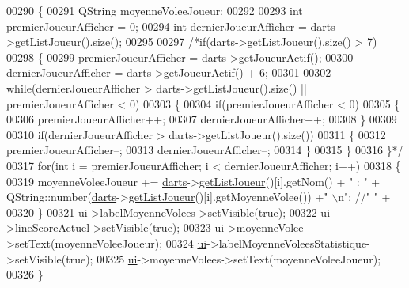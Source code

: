 \begin{DoxyCode}
00290 \{
00291     QString moyenneVoleeJoueur;
00292 
00293     \textcolor{keywordtype}{int} premierJoueurAfficher = 0;
00294     \textcolor{keywordtype}{int} dernierJoueurAfficher = \hyperlink{class_ihm_a2a0f54d33f4d6b2531ec2190c4a2356e}{darts}->\hyperlink{class_darts_a0525b09703d3461bf5570197354743c3}{getListJoueur}().size();
00295 
00297     \textcolor{comment}{/*if(darts->getListJoueur().size() > 7)}
00298 \textcolor{comment}{    \{}
00299 \textcolor{comment}{        premierJoueurAfficher = darts->getJoueurActif();}
00300 \textcolor{comment}{        dernierJoueurAfficher = darts->getJoueurActif() + 6;}
00301 \textcolor{comment}{}
00302 \textcolor{comment}{        while(dernierJoueurAfficher > darts->getListJoueur().size() || premierJoueurAfficher < 0)}
00303 \textcolor{comment}{        \{}
00304 \textcolor{comment}{            if(premierJoueurAfficher < 0)}
00305 \textcolor{comment}{            \{}
00306 \textcolor{comment}{                premierJoueurAfficher++;}
00307 \textcolor{comment}{                dernierJoueurAfficher++;}
00308 \textcolor{comment}{            \}}
00309 \textcolor{comment}{}
00310 \textcolor{comment}{            if(dernierJoueurAfficher > darts->getListJoueur().size())}
00311 \textcolor{comment}{            \{}
00312 \textcolor{comment}{                premierJoueurAfficher--;}
00313 \textcolor{comment}{                dernierJoueurAfficher--;}
00314 \textcolor{comment}{            \}}
00315 \textcolor{comment}{        \}}
00316 \textcolor{comment}{    \}*/}
00317     \textcolor{keywordflow}{for}(\textcolor{keywordtype}{int} i = premierJoueurAfficher; i < dernierJoueurAfficher; i++)
00318     \{
00319         moyenneVoleeJoueur += \hyperlink{class_ihm_a2a0f54d33f4d6b2531ec2190c4a2356e}{darts}->\hyperlink{class_darts_a0525b09703d3461bf5570197354743c3}{getListJoueur}()[i].getNom() + \textcolor{stringliteral}{" : "} + 
      QString::number(\hyperlink{class_ihm_a2a0f54d33f4d6b2531ec2190c4a2356e}{darts}->\hyperlink{class_darts_a0525b09703d3461bf5570197354743c3}{getListJoueur}()[i].getMoyenneVolee()) +\textcolor{stringliteral}{" \(\backslash\)n"}; \textcolor{comment}{//"         " +}
00320     \}
00321     \hyperlink{class_ihm_a0ac5f47856566ceeeca1720109bf70ea}{ui}->labelMoyenneVolees->setVisible(\textcolor{keyword}{true});
00322     \hyperlink{class_ihm_a0ac5f47856566ceeeca1720109bf70ea}{ui}->lineScoreActuel->setVisible(\textcolor{keyword}{true});
00323     \hyperlink{class_ihm_a0ac5f47856566ceeeca1720109bf70ea}{ui}->moyenneVolee->setText(moyenneVoleeJoueur);
00324     \hyperlink{class_ihm_a0ac5f47856566ceeeca1720109bf70ea}{ui}->labelMoyenneVoleesStatistique->setVisible(\textcolor{keyword}{true});
00325     \hyperlink{class_ihm_a0ac5f47856566ceeeca1720109bf70ea}{ui}->moyenneVolees->setText(moyenneVoleeJoueur);
00326 \}
\end{DoxyCode}
\mbox{\label{class_ihm_a238255f517506367fe8913b2dad50c65}} 
